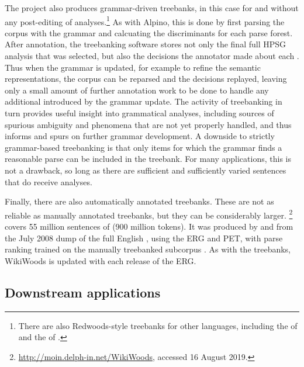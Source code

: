 \documentclass[output=paper
                ,modfonts
                ,nonflat
	        ,collection
	        ,collectionchapter
	        ,collectiontoclongg
 	        ,biblatex
                ,babelshorthands
                ,newtxmath
                ,draftmode
                ,colorlinks, citecolor=brown
]{./langsci/langscibook}
\begin{document}
The  project \citep{OFTM2004a-u} also produces grammar-driven
treebanks, in this case for  and without any post-editing of
analyses.\footnote{There are also Redwoods-style treebanks for other
  languages, including the  of 
  \citep{bond:etal:2004} and the  of 
  \citep{marimon:2015}.}  As with Alpino, this is done by first
parsing the corpus with the grammar and calcuating the discriminants
for each parse forest.  After annotation, the treebanking software stores not
only the final full HPSG analysis that was selected, but also the
decisions the annotator made about each .
Thus when the grammar is updated, for example to refine the semantic representations,
the corpus can be reparsed and the decisions replayed,
leaving only a small amount of further annotation work to be
done to handle any additional  introduced by the grammar update.
The activity of treebanking in turn provides useful insight into grammatical analyses,
including sources of spurious ambiguity and phenomena that are not yet
properly handled, and thus informs and spurs on further grammar
development.  A downside to strictly grammar-based treebanking is that
only items for which the grammar finds a reasonable parse can be
included in the treebank. For many applications, this is not a
drawback, so long as there are sufficient and sufficiently varied
sentences that do receive analyses.

Finally, there are also automatically annotated treebanks.
These are not as reliable as manually annotated treebanks,
but they can be considerably larger.
\footnote{\url{http://moin.delph-in.net/WikiWoods}, accessed 16 August 2019.}
covers 55 million sentences of  (900 million tokens).
It was produced by \citet{flickinger2010wikiwoods} and \citet{solberg2012wikiwoods}
from the July 2008 dump of the full English ,
using the ERG and PET,
with parse ranking trained on the manually treebanked subcorpus  \citep{ytrestol2009wescience}.
As with the  treebanks, WikiWoods is updated with each release of the ERG.%
%
%
%
%
%



\subsection{Downstream applications}
\label{cl:downstream}
\end{document}
